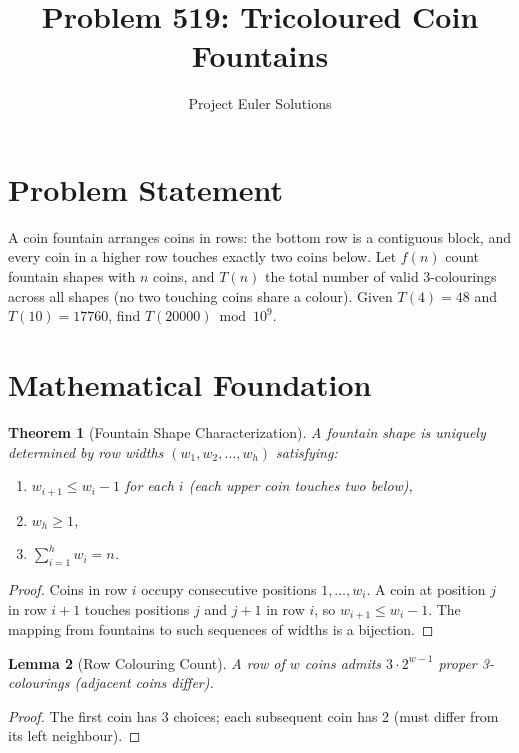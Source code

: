 \documentclass[11pt]{article}
\title{Problem 519: Tricoloured Coin Fountains}
\author{Project Euler Solutions}
\date{}
\newtheorem{theorem}{Theorem}
\newtheorem{lemma}[theorem]{Lemma}
\begin{document}
\maketitle

\section{Problem Statement}

A coin fountain arranges coins in rows: the bottom row is a contiguous block, and every coin in a higher row touches exactly two coins below. Let $f(n)$ count fountain shapes with $n$ coins, and $T(n)$ the total number of valid 3-colourings across all shapes (no two touching coins share a colour). Given $T(4) = 48$ and $T(10) = 17760$, find $T(20000) \bmod 10^9$.

\section{Mathematical Foundation}

\begin{theorem}[Fountain Shape Characterization]
A fountain shape is uniquely determined by row widths $(w_1, w_2, \ldots, w_h)$ satisfying:
\begin{enumerate}
    \item $w_{i+1} \leq w_i - 1$ for each $i$ (each upper coin touches two below),
    \item $w_h \geq 1$,
    \item $\sum_{i=1}^h w_i = n$.
\end{enumerate}
\end{theorem}

\begin{proof}
Coins in row $i$ occupy consecutive positions $1, \ldots, w_i$. A coin at position $j$ in row $i+1$ touches positions $j$ and $j+1$ in row $i$, so $w_{i+1} \leq w_i - 1$. The mapping from fountains to such sequences of widths is a bijection.
\end{proof}

\begin{lemma}[Row Colouring Count]
A row of $w$ coins admits $3 \cdot 2^{w-1}$ proper 3-colourings (adjacent coins differ).
\end{lemma}

\begin{proof}
The first coin has 3 choices; each subsequent coin has 2 (must differ from its left neighbour).
\end{proof}
\end{document}
